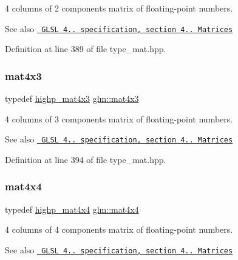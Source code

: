 4 columns of 2 components matrix of floating-\/point numbers.

\begin{DoxySeeAlso}{See also}
\href{http://www.opengl.org/registry/doc/GLSLangSpec.4.20.8.pdf}{\texttt{ G\+L\+SL 4.. specification, section 4.. Matrices}} 
\end{DoxySeeAlso}


Definition at line 389 of file type\+\_\+mat.\+hpp.

\mbox{\label{group__core__types_gad3f3f750dcdc74a9037342c5cae55f5e}} 
\subsubsection{\texorpdfstring{mat4x3}{mat4x3}}
{\footnotesize\ttfamily typedef \mbox{\hyperlink{group__core__precision_ga549b3b126dfbf5f9fef6b76deb15cb4e}{highp\+\_\+mat4x3}} \mbox{\hyperlink{group__core__types_gad3f3f750dcdc74a9037342c5cae55f5e}{glm\+::mat4x3}}}

4 columns of 3 components matrix of floating-\/point numbers.

\begin{DoxySeeAlso}{See also}
\href{http://www.opengl.org/registry/doc/GLSLangSpec.4.20.8.pdf}{\texttt{ G\+L\+SL 4.. specification, section 4.. Matrices}} 
\end{DoxySeeAlso}


Definition at line 394 of file type\+\_\+mat.\+hpp.

\mbox{\label{group__core__types_ga63e3ee9447ed593484140a9368e738ec}} 
\subsubsection{\texorpdfstring{mat4x4}{mat4x4}}
{\footnotesize\ttfamily typedef \mbox{\hyperlink{group__core__precision_gaccec2a0346f946bcbd656386a9ab87d7}{highp\+\_\+mat4x4}} \mbox{\hyperlink{group__core__types_ga63e3ee9447ed593484140a9368e738ec}{glm\+::mat4x4}}}

4 columns of 4 components matrix of floating-\/point numbers.

\begin{DoxySeeAlso}{See also}
\href{http://www.opengl.org/registry/doc/GLSLangSpec.4.20.8.pdf}{\texttt{ G\+L\+SL 4.. specification, section 4.. Matrices}} 
\end{DoxySeeAlso}


